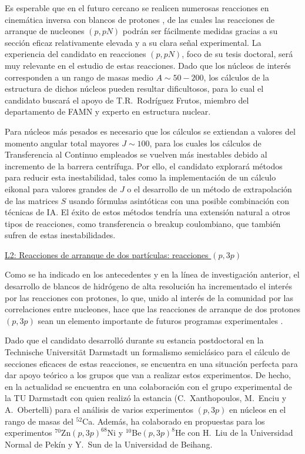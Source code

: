\documentclass[a4paper,12pt,twoside]{article}
\begin{document}
Es esperable que en el futuro cercano se realicen numerosas reacciones en cinemática inversa con blancos de protones \cite{r3b24,onokoro}, de las cuales las reacciones de arranque de nucleones $(p,pN)$ podrán ser fácilmente medidas gracias a su sección eficaz relativamente elevada y a su clara señal experimental. La experiencia del candidato en reacciones $(p,pN)$, foco de su tesis doctoral, será muy relevante en el estudio de estas reacciones. Dado que los núcleos de interés corresponden a un rango de masas medio $A\sim 50-200$, los cálculos de la estructura de dichos núcleos pueden resultar dificultosos, para lo cual el candidato buscará el apoyo de T.R.~Rodríguez Frutos, miembro del departamento de FAMN y experto en estructura nuclear.

Para núcleos más pesados es necesario que los cálculos se extiendan a valores del momento angular total mayores $J\sim 100$, para los cuales los cálculos de Transferencia al Continuo empleados se vuelven más inestables debido al incremento de la barrera centrífuga. Por ello, el candidato explorará métodos para reducir esta inestabilidad, tales como la implementación de un cálculo eikonal para valores grandes de $J$ o el desarrollo de un método de extrapolación de las matrices $S$ usando fórmulas asintóticas con una posible combinación con técnicas de IA. El éxito de estos métodos tendría una extensión natural a otros tipos de reacciones, como transferencia o breakup coulombiano, que también sufren de estas inestabilidades.

\underline{L2: Reacciones de arranque de dos partículas: reacciones $(p,3p)$}

Como se ha indicado en los antecedentes y en la línea de investigación anterior, el desarrollo de blancos de hidrógeno de alta resolución ha incrementado el interés por las reacciones con protones, lo que, unido al interés de la comunidad por las correlaciones entre nucleones, hace que las reacciones de arranque de dos protones $(p,3p)$ sean un elemento importante de futuros programas experimentales \cite{onokoro}.

Dado que el candidato desarrolló durante su estancia postdoctoral en la Technische Universität Darmstadt un formalismo semiclásico para el cálculo de secciones eficaces de estas reacciones, se encuentra en una situación perfecta para dar apoyo teórico a los grupos que van a realizar estos experimentos. De hecho, en la actualidad se encuentra en una colaboración con el grupo experimental de la TU Darmstadt con quien realizó la estancia (C.~Xanthopoulos, M.~Enciu y A.~Obertelli) para el análisis de varios experimentos $(p,3p)$ en núcleos en el rango de masas del $^{52}$Ca. Además, ha colaborado en propuestas para los experimentos $^{70}$Zn$(p,3p)^{68}$Ni y $^{10}$Be$(p,3p)^8$He con H.~Liu de la Universidad Normal de Pekín y Y.~Sun de la Universidad de Beihang.
\end{document}
